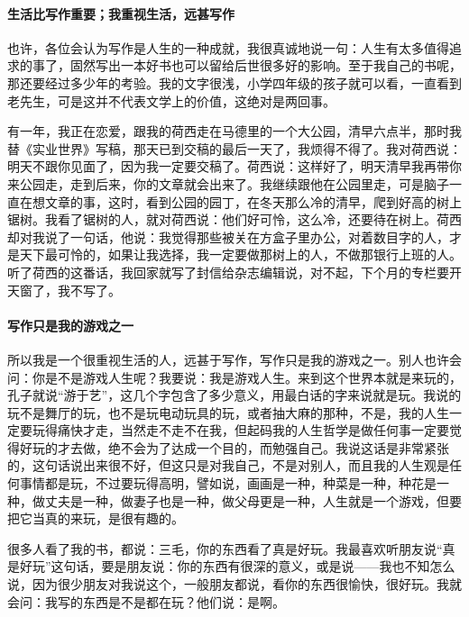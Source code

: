 \paragraph*{生活比写作重要；我重视生活，远甚写作}
\par 也许，各位会认为写作是人生的一种成就，我很真诚地说一句：人生有太多值得追求的事了，固然写出一本好书也可以留给后世很多好的影响。至于我自己的书呢，那还要经过多少年的考验。我的文字很浅，小学四年级的孩子就可以看，一直看到老先生，可是这并不代表文学上的价值，这绝对是两回事。
\par 有一年，我正在恋爱，跟我的荷西走在马德里的一个大公园，清早六点半，那时我替《实业世界》写稿，那天已到交稿的最后一天了，我烦得不得了。我对荷西说：明天不跟你见面了，因为我一定要交稿了。荷西说：这样好了，明天清早我再带你来公园走，走到后来，你的文章就会出来了。我继续跟他在公园里走，可是脑子一直在想文章的事，这时，看到公园的园丁，在冬天那么冷的清早，爬到好高的树上锯树。我看了锯树的人，就对荷西说：他们好可怜，这么冷，还要待在树上。荷西却对我说了一句话，他说：我觉得那些被关在方盒子里办公，对着数目字的人，才是天下最可怜的，如果让我选择，我一定要做那树上的人，不做那银行上班的人。听了荷西的这番话，我回家就写了封信给杂志编辑说，对不起，下个月的专栏要开天窗了，我不写了。

\paragraph*{写作只是我的游戏之一}
\par 所以我是一个很重视生活的人，远甚于写作，写作只是我的游戏之一。别人也许会问：你是不是游戏人生呢？我要说：我是游戏人生。来到这个世界本就是来玩的，孔子就说“游于艺”，这几个字包含了多少意义，用最白话的字来说就是玩。我说的玩不是舞厅的玩，也不是玩电动玩具的玩，或者抽大麻的那种，不是，我的人生一定要玩得痛快才走，当然走不走不在我，但起码我的人生哲学是做任何事一定要觉得好玩的才去做，绝不会为了达成一个目的，而勉强自己。我说这话是非常紧张的，这句话说出来很不好，但这只是对我自己，不是对别人，而且我的人生观是任何事情都是玩，不过要玩得高明，譬如说，画画是一种，种菜是一种，种花是一种，做丈夫是一种，做妻子也是一种，做父母更是一种，人生就是一个游戏，但要把它当真的来玩，是很有趣的。
\par 很多人看了我的书，都说：三毛，你的东西看了真是好玩。我最喜欢听朋友说“真是好玩”这句话，要是朋友说：你的东西有很深的意义，或是说——我也不知怎么说，因为很少朋友对我说这个，一般朋友都说，看你的东西很愉快，很好玩。我就会问：我写的东西是不是都在玩？他们说：是啊。


